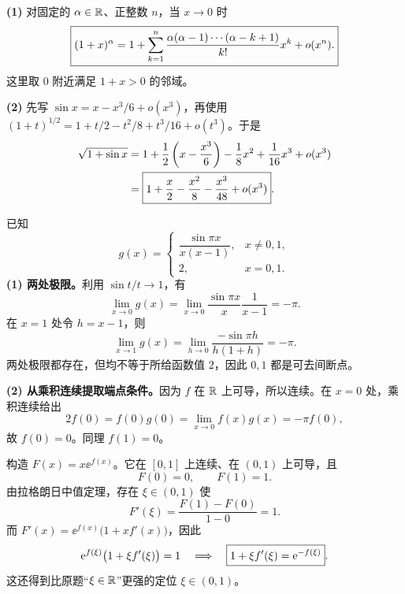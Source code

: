 \textbf{(1)} 对固定的 $\alpha\in\mathbb R$、正整数 $n$，当 $x\to0$ 时
\[
\boxed{(1+x)^\alpha=1+\sum_{k=1}^{n}
\frac{\alpha(\alpha-1)\cdots(\alpha-k+1)}{k!}x^k+o(x^n).}
\]
这里取 $0$ 附近满足 $1+x>0$ 的邻域。

\textbf{(2)} 先写 $\sin x=x-x^3/6+o(x^3)$，再使用
$(1+t)^{1/2}=1+t/2-t^2/8+t^3/16+o(t^3)$。于是
\begin{align*}
\sqrt{1+\sin x}
&=1+\frac12\left(x-\frac{x^3}6\right)-\frac18x^2+\frac1{16}x^3+o(x^3)\\
&=\boxed{1+\frac x2-\frac{x^2}8-\frac{x^3}{48}+o(x^3)}.
\end{align*}

\newpage
{}
已知
\[
g(x)=\begin{cases}\dfrac{\sin\pi x}{x(x-1)},&x\ne0,1,\\[4pt]2,&x=0,1.
\end{cases}
\]
\textbf{(1) 两处极限。}利用 $\sin t/t\to1$，有
\[
\lim_{x\to0}g(x)
=\lim_{x\to0}\frac{\sin\pi x}{x}\frac1{x-1}=-\pi.
\]
在 $x=1$ 处令 $h=x-1$，则
\[
\lim_{x\to1}g(x)
=\lim_{h\to0}\frac{-\sin\pi h}{h(1+h)}=-\pi.
\]
两处极限都存在，但均不等于所给函数值 $2$，因此 $0,1$ 都是可去间断点。

\textbf{(2) 从乘积连续提取端点条件。}因为 $f$ 在 $\mathbb R$ 上可导，所以连续。在 $x=0$ 处，乘积连续给出
\[
2f(0)=f(0)g(0)=\lim_{x\to0}f(x)g(x)=-\pi f(0),
\]
故 $f(0)=0$。同理 $f(1)=0$。

构造 $F(x)=x\ee^{f(x)}$。它在 $[0,1]$ 上连续、在 $(0,1)$ 上可导，且
\[
F(0)=0,\qquad F(1)=1.
\]
由拉格朗日中值定理，存在 $\xi\in(0,1)$ 使
\[
F'(\xi)=\frac{F(1)-F(0)}{1-0}=1.
\]
而 $F'(x)=\ee^{f(x)}\bigl(1+xf'(x)\bigr)$，因此
\[
\mathrm e^{f(\xi)}\bigl(1+\xi f'(\xi)\bigr)=1
\quad\Longrightarrow\quad
\boxed{1+\xi f'(\xi)=\mathrm e^{-f(\xi)}}.
\]
这还得到比原题“$\xi\in\mathbb R$”更强的定位 $\xi\in(0,1)$。

